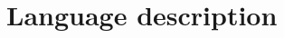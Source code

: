 \documentclass[english,submission,code=tt]{programming}
\begin{document}
\printbibliography

\appendix

\section{Language description}\label{sec:language-description}


\end{document}
